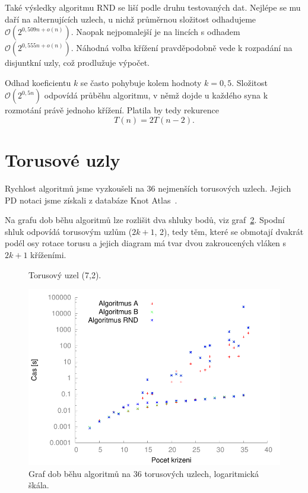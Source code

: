 Také výsledky algoritmu RND se liší podle druhu testovaných dat. Nejlépe se mu daří na alternujících uzlech, u nichž průměrnou složitost odhadujeme $\mathcal{O}\left(2^{0,509 n+ o(n)}\right)$. Naopak nejpomalejší je na lincích s odhadem $\mathcal{O}\left(2^{0,555 n+ o(n)}\right)$. Náhodná volba křížení pravděpodobně vede k rozpadání na disjuntkní uzly, což prodlužuje výpočet.

Odhad koeficientu $k$ se často pohybuje kolem hodnoty $k=0,5$. Složitost $\mathcal{O}\left(2^{0,5 n}\right)$ odpovídá průběhu algoritmu, v němž dojde u každého syna k rozmotání právě jednoho křížení. Platila by tedy rekurence
$$T(n) = 2T(n-2).$$




\section{Torusové uzly} \label{torus}



Rychlost algoritmů jsme vyzkoušeli na 36 nejmenších torusových uzlech. Jejich PD notaci jsme získali z databáze Knot Atlas~\cite{knotatlas}.

Na grafu dob běhu algoritmů lze rozlišit dva shluky bodů, viz graf~\ref{obr03:torusSrov}. Spodní shluk odpovídá torusovým uzlům ($2k+1$, 2), tedy těm, které se obmotají dvakrát podél osy rotace torusu a jejich diagram má tvar dvou zakroucených vláken s~$2k+1$ kříženími.

\begin{figure}[H]\centering
{}
\caption{Torusový uzel (7,2).}
\label{obr03:torus7}
\end{figure}

\begin{figure}[p]\centering
\includegraphics{../img/torusSrov}
\caption{Graf dob běhu algoritmů na 36 torusových uzlech, logaritmická škála.}
\label{obr03:torusSrov}
\end{figure}


